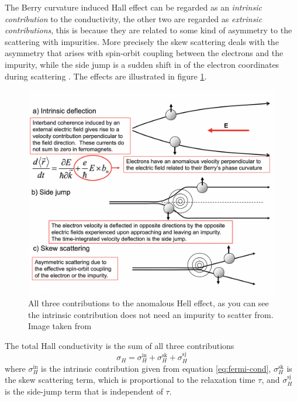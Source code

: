 The Berry curvature induced Hall effect can be regarded as an \textit{intrinsic contribution} to the conductivity, the other two are regarded as \textit{extrinsic contributions}, this is because they are related to some kind of asymmetry to the scattering with impurities. More precisely the skew scattering deals with the asymmetry that arises with spin-orbit coupling between the electrons and the impurity, while the side jump is a sudden shift in of the electron coordinates during scattering \cite{berger1970side}. The effects are illustrated in figure \ref{fig:anomalous-contributions}.
\begin{figure}
    \centering
    \includegraphics[width=\linewidth]{Immagini/ValleyHall/anomalous.png}
    \caption{All three contributions to the anomalous Hell effect, as you can see the intrinsic contribution does not need an impurity to scatter from. Image taken from \cite{nagaosa2010anomalous}}
    \label{fig:anomalous-contributions}
\end{figure}
The total Hall conductivity is the sum of all three contributions
\begin{equation}
    \sigma_H=\sigma_H^\textrm{in}+\sigma_H^\textrm{sk}+\sigma_H^\textrm{sj}
\end{equation}
where $\sigma_H^\textrm{in}$ is the intrinsic contribution given from equation \ref{eq:fermi-cond}, $\sigma_H^\textrm{sk}$ is the skew scattering term, which is proportional to the relaxation time $\tau$, and $\sigma_H^\textrm{sj}$ is the side-jump term that is independent of $\tau$.

